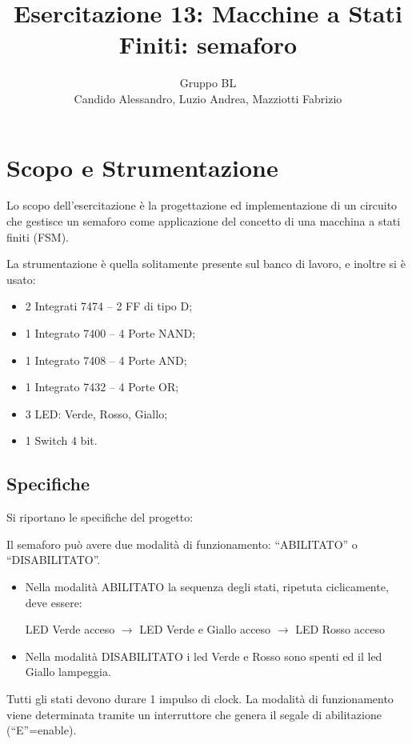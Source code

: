 \documentclass[a4paper,10pt]{article}
\title{Esercitazione 13: Macchine a Stati Finiti: semaforo}
\author{Gruppo BL \\ Candido Alessandro, Luzio Andrea, Mazziotti Fabrizio}
\begin{document}
\maketitle

\section{Scopo e Strumentazione}
Lo scopo dell'esercitazione è la progettazione ed implementazione di un circuito che gestisce un semaforo come applicazione del concetto di una macchina a stati finiti (FSM).
\newline

\noindent La strumentazione è quella solitamente presente sul banco di lavoro, e inoltre si è usato:
\begin{itemize}
	\item 2 Integrati 7474 – 2 FF di tipo D;
	\item 1 Integrato 7400 – 4 Porte NAND;
	\item 1 Integrato 7408 – 4 Porte AND;
	\item 1 Integrato 7432 – 4 Porte OR;
	\item 3 LED: Verde, Rosso, Giallo;
	\item 1 Switch 4 bit.
\end{itemize}

\subsection{Specifiche}

Si riportano le specifiche del progetto:
\newline

\noindent Il semaforo può avere due modalità di funzionamento: “ABILITATO” o “DISABILITATO”.
\begin{itemize}
	\item 
	Nella modalità ABILITATO la sequenza degli stati, ripetuta ciclicamente, deve essere:
	
	\qquad LED Verde acceso $ \bm{\longrightarrow} $ LED Verde e Giallo acceso $ \bm{\longrightarrow} $ LED Rosso acceso
	
	\item Nella modalità DISABILITATO i led Verde e Rosso sono spenti ed il led Giallo lampeggia.
\end{itemize}
Tutti gli stati devono durare 1 impulso di clock. La modalità di funzionamento viene determinata tramite un interruttore che genera il segale di abilitazione (“E”=enable).
\end{document}
